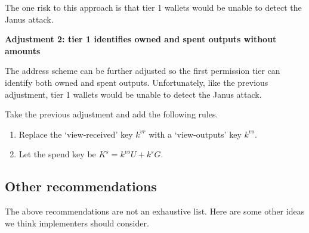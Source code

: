 The one risk to this approach is that tier 1 wallets would be unable to detect the Janus attack.

\textbf{Adjustment 2: tier 1 identifies owned and spent outputs without amounts}

The address scheme can be further adjusted so the first permission tier can identify both owned and spent outputs. Unfortunately, like the previous adjustment, tier 1 wallets would be unable to detect the Janus attack.

Take the previous adjustment and add the following rules.

\begin{enumerate}
    \item Replace the `view-received' key $k^{vr}$ with a `view-outputs' key $k^{vo}$.

    \item Let the spend key be $K^s = k^{vo} U + k^s G$.
\end{enumerate}


\subsection{Other recommendations}
\label{subsec:implementers-other-recommendations}

The above recommendations are not an exhaustive list. Here are some other ideas we think implementers should consider.

